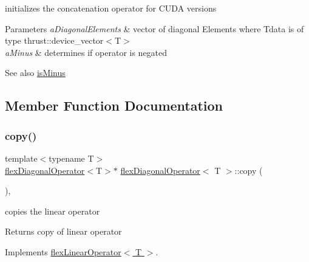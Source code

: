 initializes the concatenation operator for C\+U\+DA versions 


\begin{DoxyParams}{Parameters}
{\em a\+Diagonal\+Elements} & vector of diagonal Elements where Tdata is of type thrust\+::device\+\_\+vector$<$\+T$>$ \\
\hline
{\em a\+Minus} & determines if operator is negated \\
\hline
\end{DoxyParams}
\begin{DoxySeeAlso}{See also}
\hyperlink{classflex_linear_operator_a7f986517e10aee21099ec7692b77905d}{is\+Minus} 
\end{DoxySeeAlso}


\subsection{Member Function Documentation}
\mbox{\label{classflex_diagonal_operator_aeca7325de5eaface63363e9710034128}} 
\subsubsection{\texorpdfstring{copy()}{copy()}}
{\footnotesize\ttfamily template$<$typename T$>$ \\
\hyperlink{classflex_diagonal_operator}{flex\+Diagonal\+Operator}$<$T$>$$\ast$ \hyperlink{classflex_diagonal_operator}{flex\+Diagonal\+Operator}$<$ T $>$\+::copy (\begin{DoxyParamCaption}{ }\end{DoxyParamCaption})\hspace{0.3cm}{\ttfamily [inline]}, {\ttfamily [virtual]}}



copies the linear operator 

\begin{DoxyReturn}{Returns}
copy of linear operator 
\end{DoxyReturn}


Implements \hyperlink{classflex_linear_operator_a7cc1425677cc30fcbd092ffd28d508c9}{flex\+Linear\+Operator$<$ T $>$}.

\mbox{\label{classflex_diagonal_operator_ad53cb526b55141a1d0519a023572cf58}} 
